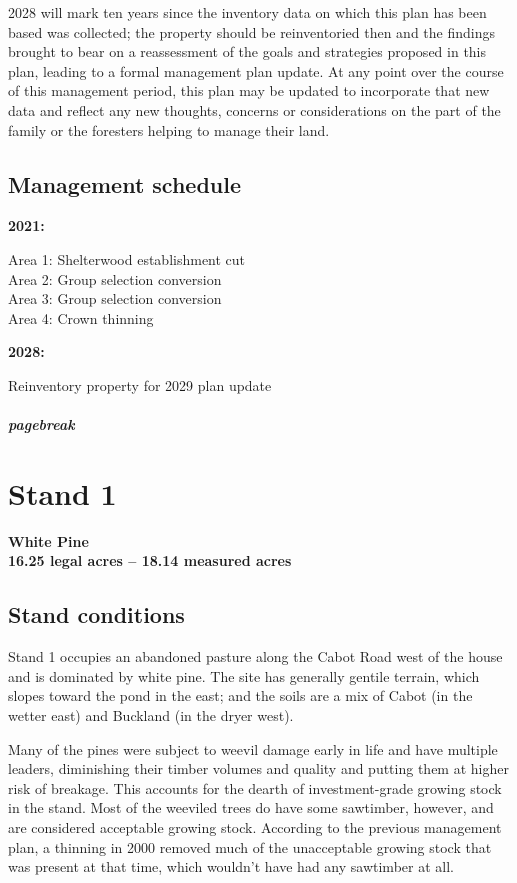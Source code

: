 \documentclass[]{tufte-handout}
\begin{document}
2028 will mark ten years since the inventory data on which this plan has
been based was collected; the property should be reinventoried then and
the findings brought to bear on a reassessment of the goals and
strategies proposed in this plan, leading to a formal management plan
update. At any point over the course of this management period, this
plan may be updated to incorporate that new data and reflect any new
thoughts, concerns or considerations on the part of the family or the
foresters helping to manage their land.

\subsection{Management schedule}\label{management-schedule}

\textbf{2021:}

Area 1: Shelterwood establishment cut\\
Area 2: Group selection conversion\\
Area 3: Group selection conversion\\
Area 4: Crown thinning

\textbf{2028:}

Reinventory property for 2029 plan update

\subparagraph{pagebreak}\label{pagebreak-1}

\section{Stand 1}\label{stand-1}

\textbf{White Pine}\\
\textbf{16.25 legal acres -- 18.14 measured acres}

\subsection{Stand conditions}\label{stand-conditions}

Stand 1 occupies an abandoned pasture along the Cabot Road west of the
house and is dominated by white pine. The site has generally gentile
terrain, which slopes toward the pond in the east; and the soils are a
mix of Cabot (in the wetter east) and Buckland (in the dryer west).

Many of the pines were subject to weevil damage early in life and have
multiple leaders, diminishing their timber volumes and quality and
putting them at higher risk of breakage. This accounts for the dearth of
investment-grade growing stock in the stand. Most of the weeviled trees
do have some sawtimber, however, and are considered acceptable growing
stock. According to the previous management plan, a thinning in 2000
removed much of the unacceptable growing stock that was present at that
time, which wouldn't have had any sawtimber at all.
\end{document}
